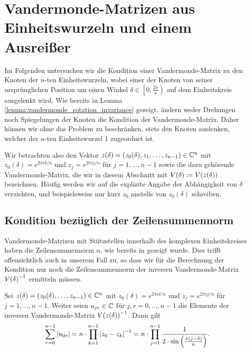 \section{Vandermonde-Matrizen aus  Einheitswurzeln und einem Ausreißer}

Im Folgenden untersuchen wir die Kondition einer Vandermonde-Matrix zu den
Knoten der $n$-ten Einheitswurzeln, wobei einer der Knoten von seiner
ursprünglichen Position um einen Winkel $\delta \in \left[0,\frac{2
\pi}{n}\right)$ auf dem Einheitskreis ausgelenkt wird.
Wie bereits in Lemma \ref{lemma:vandermonde_rotation_invariance} gezeigt,
ändern weder Drehungen noch Spiegelungen der Knoten die Kondition der
Vandermonde-Matrix.
Daher können wir ohne das Problem zu beschränken, stets den Knoten auslenken,
welcher der $n$-ten Einheitswurzel $1$ zugeordnet ist.

Wir betrachten also den Vektor $z(\delta) = (z_0(\delta), z_1, \dots, z_{n-1}) \in \mathbb{C}^n$ mit
$z_0(\delta) = e^{2 \pi i \delta / n}$
und
$z_j = e^{2 \pi i j / n}$ für $j = 1, \dots, n-1$
sowie die dazu gehörende Vandermonde-Matrix, die wir in diesem Abschnitt
mit $V \! \left( \delta \right) \coloneqq V \! \left( z(\delta) \right)$ bezeichnen.
Häufig werden wir auf die explizite Angabe der Abhängigkeit von $\delta$
verzichten, und beispielsweise nur kurz $z_0$ anstelle von $z_0(\delta)$
schreiben.

\subsection{Kondition bezüglich der Zeilensummennorm}

Vandermonde-Matrizen mit Stützstellen innerhalb des komplexen Einheitskreises
haben die Zeilensummennorm $n$, wie bereits in
 gezeigt wurde.
Dies trifft offensichtlich auch in unserem Fall zu, so dass wir für die
Berechnung der Kondition nur noch die Zeilensummennorm der inversen
Vandermonde-Matrix $V \! \left( \delta \right)^{-1}$ ermitteln müssen.

\begin{lemma}
    \label{lemma:inverse_outlier_vandermonde_first_row_abs_sum}
    Sei $z(\delta) = (z_0(\delta), \dots, z_{n-1}) \in \mathbb{C}^n$ mit
    $z_0(\delta) = e^{2 \pi i \delta / n}$
    und
    $z_j = e^{2 \pi i j / n}$ für $j = 1, \dots, n-1$.
    Weiter seien $u_{jr} \in \mathbb{C}$ für $j,r = 0,\dots,n-1$ die Elemente der
    inversen Vandermonde-Matrix $V \! \left( z(\delta) \right)^{-1}$.
    Dann gilt
    \[
        \sum_{r=0}^{n-1} \left\lvert  u_{0r}  \right\rvert
        = n \cdot \prod_{k=1}^{n-1} \left\lvert z_0 - z_k \right\rvert^{-1}
        = n \cdot \prod_{j=1}^{n-1} \frac{1}{2 \cdot \sin \left(\frac{\pi (j - \delta)}{n} \right)}.
    \]
\end{lemma}

